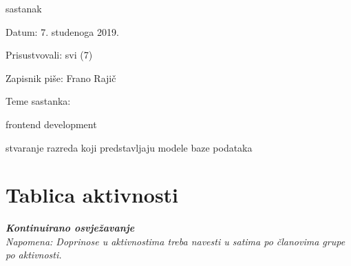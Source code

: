 \begin{packed_enum}
			\item  sastanak
			\item[] \begin{packed_item}
				\item Datum: 7. studenoga 2019.
				\item Prisustvovali: svi (7)
				\item Zapisnik piše: Frano Rajič
				\item Teme sastanka:
				\begin{packed_item}
					\item frontend development
					\item stvaranje razreda koji predstavljaju modele baze podataka
				\end{packed_item}
			\end{packed_item}
			
		\end{packed_enum}
		
		\eject
		\section*{Tablica aktivnosti}
		
			\textbf{\textit{Kontinuirano osvježavanje}}\\
			
			 \textit{Napomena: Doprinose u aktivnostima treba navesti u satima po članovima grupe po aktivnosti.}
					
